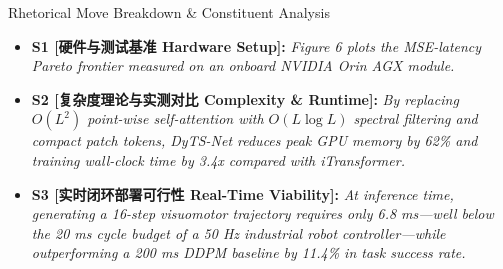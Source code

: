 \begin{TipBox}{Rhetorical Move Breakdown \& Constituent Analysis}
\begin{itemize}[leftmargin=1.5em]
  \item \textbf{S1 [硬件与测试基准 Hardware Setup]:} \textit{Figure 6 plots the MSE-latency Pareto frontier measured on an onboard NVIDIA Orin AGX module.}\par{}
  \item \textbf{S2 [复杂度理论与实测对比 Complexity \& Runtime]:} \textit{By replacing $O(L^2)$ point-wise self-attention with $O(L \log L)$ spectral filtering and compact patch tokens, DyTS-Net reduces peak GPU memory by 62\% and training wall-clock time by 3.4x compared with iTransformer.}\par{}
  \item \textbf{S3 [实时闭环部署可行性 Real-Time Viability]:} \textit{At inference time, generating a 16-step visuomotor trajectory requires only 6.8 ms---well below the 20 ms cycle budget of a 50 Hz industrial robot controller---while outperforming a 200 ms DDPM baseline by 11.4\% in task success rate.}\par{}
\end{itemize}
\end{TipBox}
\medskip
